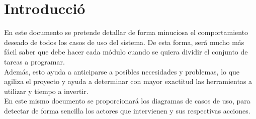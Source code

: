 \section{Introducció}\label{sec:intro}

\begin{flushleft}
En este documento se pretende detallar de forma minuciosa el comportamiento deseado de todos los casos de uso del sistema. De esta forma, será mucho más fácil saber que debe hacer cada módulo cuando se quiera dividir el conjunto de tareas a programar.\\


Además, esto ayuda a anticiparse a posibles necesidades y problemas, lo que agiliza el proyecto y ayuda a determinar con mayor exactitud las herramientas a utilizar y tiempo a invertir.\\


En este mismo documento se proporcionará los diagramas de casos de uso, para detectar de forma sencilla los actores que intervienen y sus respectivas acciones.\\
\end{flushleft}
